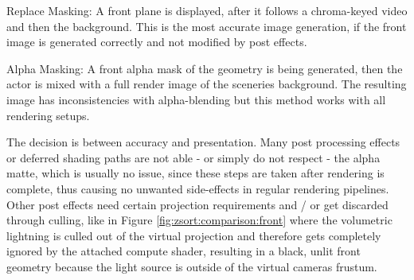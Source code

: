 \begin{my_list}
	\item Replace Masking: A front plane is displayed, after it follows a 
	chroma-keyed video and then the background. This is the most accurate image 
	generation, if the front image is generated correctly and not modified by 
	post effects.
	\item Alpha Masking: A front alpha mask of the geometry is being generated, 
	then the actor is mixed with a full render image of the sceneries 
	background. The resulting image has inconsistencies with alpha-blending but 
	this method works with all rendering setups.
\end{my_list}

The decision is between accuracy and presentation. Many post processing effects 
or deferred shading paths are not able - or simply do not respect - the alpha 
matte, which is usually no issue, since these steps are taken after rendering 
is complete, thus causing no unwanted side-effects in regular rendering 
pipelines. Other post effects need certain projection requirements and / or get 
discarded through culling, like in Figure \ref{fig:zsort:comparison:front} 
where the volumetric lightning is culled out of the virtual projection and 
therefore gets completely ignored by the attached compute shader, resulting in 
a black, unlit front geometry because the light source is outside of the 
virtual cameras frustum. 

